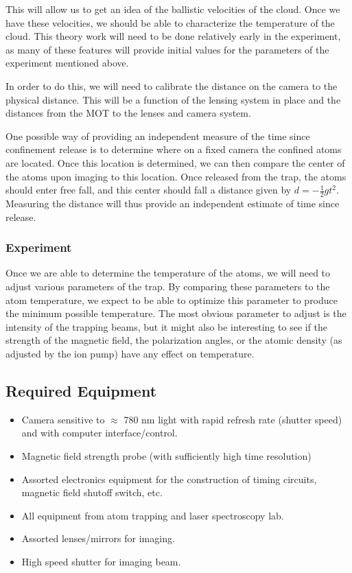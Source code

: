\documentclass[12pt]{article}
\begin{document}
	This will allow us to get an idea of the ballistic velocities of the cloud.  Once we have these velocities, we should be able to characterize the temperature of the cloud.  This theory work will need to be done relatively early in the experiment, as many of these features will provide initial values for the parameters of the experiment mentioned above.
	
	In order to do this, we will need to calibrate the distance on the camera to the physical distance.  This will be a function of the lensing system in place and the distances from the MOT to the lenses and camera system.
	
	One possible way of providing an independent measure of the time since confinement release is to determine where on a fixed camera the confined atoms are located.  Once this location is determined, we can then compare the center of the atoms upon imaging to this location.  Once released from the trap, the atoms should enter free fall, and this center should fall a distance given by $d = -\frac{1}{2}g t^2$.  Measuring the distance will thus provide an independent estimate of time since release.
	
\subsubsection*{Experiment}

	Once we are able to determine the temperature of the atoms, we will need to adjust various parameters of the trap.  By comparing these parameters to the atom temperature, we expect to be able to optimize this parameter to produce the minimum possible temperature.  The most obvious parameter to adjust is the intensity of the trapping beams, but it might also be interesting to see if the strength of the magnetic field, the polarization angles, or the atomic density (as adjusted by the ion pump) have any effect on temperature.
	
\subsection*{Required Equipment}

\begin{itemize}
	\item Camera sensitive to $\approx$ 780 nm light with rapid refresh rate (shutter speed) and with computer interface/control.
	\item Magnetic field strength probe (with sufficiently high time resolution)
	\item Assorted electronics equipment for the construction of timing circuits, magnetic field shutoff switch, etc.
	\item All equipment from atom trapping and laser spectroscopy lab.
	\item Assorted lenses/mirrors for imaging.
	\item High speed shutter for imaging beam.
\end{itemize}
	
	
\end{document}

